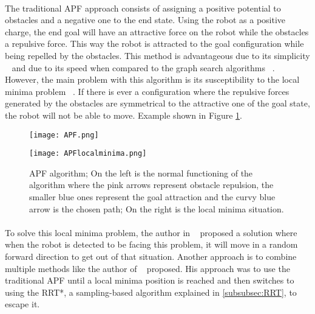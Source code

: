 \paragraph{}The traditional \gls{APF} approach consists of assigning a positive potential to obstacles and a negative one to the end state. Using the robot as a positive charge, 
the end goal will have an attractive force on the robot while the obstacles a repulsive force. 
This way the robot is attracted to the goal configuration while being repelled by the obstacles. 
This method is advantageous due to its simplicity ~\cite{9830995} and due to its speed when compared to the graph search algorithms ~\cite{100007}. 
However, the main problem with this algorithm is its susceptibility to the local minima problem ~\cite{9830995, 100007}. 
If there is ever a configuration where the repulsive forces generated by the obstacles are symmetrical to the attractive one of the goal state, 
the robot will not be able to move. Example shown in Figure \ref{fig:APF}.
\begin{figure}[htbp]
    \centering
    \begin{minipage}[b]{0.45\textwidth}
        \centering
        \texttt{[image: APF.png]} %
    \end{minipage}
    \begin{minipage}[b]{0.45\textwidth}
        \centering
        \texttt{[image: APFlocalminima.png]} %
    \end{minipage}
    \caption{APF algorithm; On the left is the normal functioning of the algorithm where the pink arrows represent obstacle repulsion, the smaller blue ones represent the goal attraction and the curvy blue arrow is the chosen path; On the right is the local minima situation.}
    \label{fig:APF}
\end{figure}

\paragraph{}To solve this local minima problem, the author in ~\cite{9734712} proposed a solution where when the robot is detected to be facing this problem, 
it will move in a random forward direction to get out of that situation. Another approach is to combine multiple methods like the author of ~\cite{8763966} proposed. 
His approach was to use the traditional \gls{APF} until a local minima position is reached and then switches to using the RRT*, a sampling-based algorithm explained in \ref{subsubsec:RRT}, 
to escape it.
